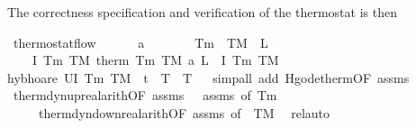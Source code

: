 \documentclass[envcountsame,envcountsect]{llncs}
\begin{document}
\begin{example}
The correctness specification and verification of the thermostat is then
\begin{isabellebody}
\isanewline
{}\isamarkupfalse%
\ thermostat{\isacharunderscore}flow{\isacharcolon}\ \isanewline
\ \ \ {\isachardoublequoteopen}{}\ {\isacharless}\ a{\isachardoublequoteclose}\ \ {\isachardoublequoteopen}{}\ {\isasymle}\ {\isasymtau}{\isachardoublequoteclose}\ \ {\isachardoublequoteopen}{}\ {\isacharless}\ T\isactrlsub m{\isachardoublequoteclose}\ \ {\isachardoublequoteopen}T\isactrlsub M\ {\isacharless}\ L{\isachardoublequoteclose}\isanewline
\ \ \ {\isachardoublequoteopen}\ \isactrlbold {\isacharbraceleft}I\ T\isactrlsub m\ T\isactrlsub M\isactrlbold {\isacharbraceright}\ therm\ T\isactrlsub m\ T\isactrlsub M\ a\ L\ {\isasymtau}\ \isactrlbold {\isacharbraceleft}I\ T\isactrlsub m\ T\isactrlsub M\isactrlbold {\isacharbraceright}{\isachardoublequoteclose}\isanewline
{}\isamarkupfalse%
{\isacharparenleft}hyb{\isacharunderscore}hoare\ {\isachardoublequoteopen}U{\isacharparenleft}I\ T\isactrlsub m\ T\isactrlsub M\ {\isasymand}\ t{\isacharequal}{}\ {\isasymand}\ T\ {\isacharequal}\ T{\isacharparenright}{\isachardoublequoteclose}{\isacharparenright}\isanewline
\ \ \isamarkupfalse%
{\isacharparenleft}simp{\isacharunderscore}all\ add{\isacharcolon}\ H{\isacharunderscore}g{\isacharunderscore}ode{\isacharunderscore}therm{\isacharbrackleft}OF\ assms{\isacharparenleft}{}{\isacharcomma}{}{\isacharparenright}{\isacharbrackright}{\isacharparenright}\isanewline
\ \ \isamarkupfalse%
\ therm{\isacharunderscore}dyn{\isacharunderscore}up{\isacharunderscore}real{\isacharunderscore}arith{\isacharbrackleft}OF\ assms{\isacharparenleft}{}{\isacharparenright}\ {\isacharunderscore}\ {\isacharunderscore}\ assms{\isacharparenleft}{}{\isacharparenright}{\isacharcomma}\ of\ T\isactrlsub m{\isacharbrackright}\isanewline
\ \ \ \ \ therm{\isacharunderscore}dyn{\isacharunderscore}down{\isacharunderscore}real{\isacharunderscore}arith{\isacharbrackleft}OF\ assms{\isacharparenleft}{}{\isacharcomma}{}{\isacharparenright}{\isacharcomma}\ of\ {\isacharunderscore}\ T\isactrlsub M{\isacharbrackright}\ \isamarkupfalse%
\ rel{\isacharunderscore}auto{\isacharprime}\isanewline
\end{isabellebody}


\end{example}
\end{document}
